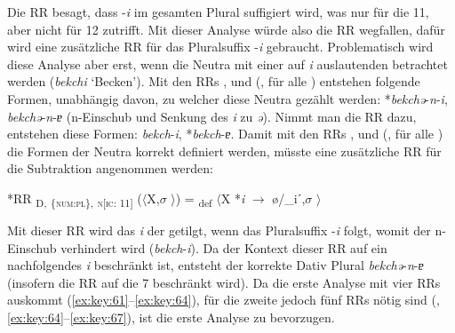 Die RR  besagt, dass -\textit{i} im gesamten Plural suffigiert wird, was nur für die  11, aber nicht für 12 zutrifft. Mit dieser Analyse würde also die RR  wegfallen, dafür wird eine zusätzliche RR für das Pluralsuffix -\textit{i} gebraucht. Problematisch wird diese Analyse aber erst, wenn die Neutra mit einer auf \textit{i} auslautenden  betrachtet werden (\textit{bekchi} ‘Becken’). Mit den RRs ,  und (, für alle ) entstehen folgende Formen, unabhängig davon, zu welcher  diese Neutra gezählt werden: *\textit{bekchə}-\textit{n}-\textit{i}, \textit{bekchə}-\textit{n}-\textit{ɐ} (n-Einschub und Senkung des \textit{i} zu \textit{ə}). Nimmt man die RR  dazu, entstehen diese Formen: \textit{bekch}-\textit{i}, *\textit{bekch}-\textit{ɐ}. Damit mit den RRs ,  und (, für alle ) die Formen der Neutra korrekt definiert werden, müsste eine zusätzliche RR für die Subtraktion angenommen werden:

\ea%
\label{ex:key:67}
 *RR \textsubscript{D,} \textsubscript{\{\textsc{num:pl}\},} \textsubscript{\textsc{n[}\textsc{ic:} 11]} ($\langle$X,$\sigma$ $\rangle$) = \textsubscript{def} $\langle$X *\textit{i} $\rightarrow$ ø/\_iˊ,$\sigma$ $\rangle$
\z

Mit dieser RR wird das \textit{i} der  getilgt, wenn das Pluralsuffix -\textit{i} folgt, womit der n-Einschub verhindert wird (\textit{bekch}-\textit{i}). Da der Kontext dieser RR auf ein nachfolgendes \textit{i} beschränkt ist, entsteht der korrekte Dativ Plural \textit{bekchə}-\textit{n}-\textit{ɐ} (insofern die RR  auf die  7 beschränkt wird). Da die erste Analyse mit vier RRs auskommt (\ref{ex:key:61}--\ref{ex:key:64}), für die zweite jedoch fünf RRs nötig sind (, \ref{ex:key:64}--\ref{ex:key:67}), ist die erste Analyse zu bevorzugen.

